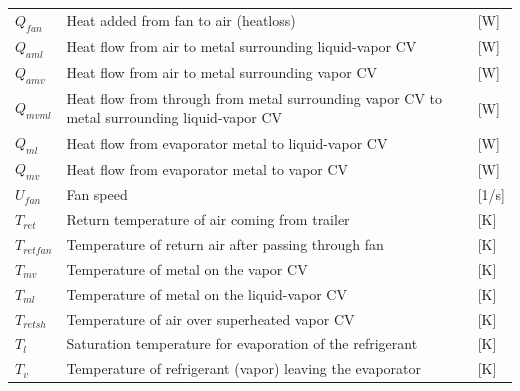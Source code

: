 \begin{center}
	\begin{tabular}{l p{10cm} l}
		$Q_{fan}$       & Heat added from fan to air (heatloss)                                                          & [\si{W}]                 \\
		$Q_{aml}$       & Heat flow from air to metal surrounding liquid-vapor CV                                        & [\si{W}]                 \\
		$Q_{amv}$       & Heat flow from air to metal surrounding vapor CV                                               & [\si{W}]                 \\
		$Q_{mvml}$      & Heat flow from through from metal surrounding vapor CV to metal surrounding liquid-vapor CV    & [\si{W}]                 \\
		$Q_{ml}$        & Heat flow from evaporator metal to liquid-vapor CV                                             & [\si{W}]                 \\
		$Q_{mv}$        & Heat flow from evaporator metal to vapor CV                                                    & [\si{W}]                 \\
		$U_{fan}$       & Fan speed                                                                                      & [1/\si{s}]               \\
		$T_{ret}$       & Return temperature of air coming from trailer                                                  & [\si{K}]                 \\
		$T_{retfan}$    & Temperature of return air after passing through fan                                            & [\si{K}]                 \\
		$T_{mv}$        & Temperature of metal on the vapor CV                                                           & [\si{K}]                 \\
		$T_{ml}$        & Temperature of metal on the liquid-vapor CV                                                    & [\si{K}]                 \\
		$T_{retsh}$     & Temperature of air over superheated vapor CV                                                   & [\si{K}]                 \\
		$T_{l}$         & Saturation temperature for evaporation of the refrigerant                                      & [\si{K}]                 \\
		$T_{v}$         & Temperature of refrigerant (vapor) leaving the evaporator                                      & [\si{K}]                 \\

\end{tabular}
\end{center}
